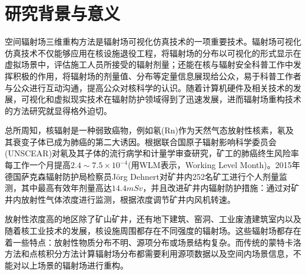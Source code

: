 \section{研究背景与意义}
空间辐射场三维重构方法是辐射场可视化仿真技术的一项重要技术。辐射场可视化仿真技术不仅能够应用在核设施退役工程，将辐射场的分布以可视化的形式显示在虚拟场景中，评估施工人员所接受的辐射剂量\textsuperscript{\cite{wang2020reconstruction}}；还能在核与辐射安全科普工作中发挥积极的作用，将辐射场的剂量值、分布等定量信息展现给公众，易于科普工作者与公众进行互动沟通，提高公众对核科学的认识\textsuperscript{\cite{曹亚丽2014科学传播模式在我国核与辐射安全科普工作中的应用}}。随着计算机硬件及相关技术的发展，可视化和虚拟现实技术在辐射防护领域得到了迅速发展\textsuperscript{\cite{chen2021visualization}}，进而辐射场重构技术的方法研究就显得格外迫切。

总所周知，核辐射是一种弱致癌物，例如氡(Rn)作为天然气态放射性核素，氡及其衰变子体已成为肺癌的第二大诱因\textsuperscript{\cite{Böhm2020Radon}}。根据联合国原子辐射影响科学委员会(UNSCEAR)对氡及其子体的流行病学和计量学审查研究，矿工的肺癌终生风险率每工作一个月提高$ 2.4 \sim 7.5 \times 10^{-4} $(用WLM表示，Working Level Month)\textsuperscript{\cite{John2021Lung}}。2015年德国萨克森辐射防护局检察员Jörg Dehnert对矿井内252名矿工进行个人剂量监测，其中最高有效年剂量高达$ 14.4 mSv $，并且改进矿井内辐射防护措施：通过对矿井内放射性气体浓度进行监测，根据浓度调节矿井内风机转速\textsuperscript{\cite{dehnert2020radon}}。

放射性浓度高的地区除了矿山矿井，还有地下建筑、窑洞、工业废渣建筑室内以及随着核工业技术的发展，核设施周围都存在不同强度的辐射场。这些辐射场都存在着一些特点：放射性物质分布不明、源项分布或场景结构复杂。而传统的蒙特卡洛方法和点核积分方法计算辐射场分布都需要利用源项数据以及空间内场景信息，不能对以上场景的辐射场进行重构。
